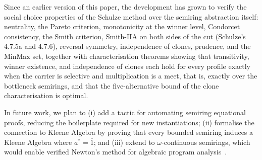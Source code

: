 \documentclass[a4paper,UKenglish,cleveref, autoref, thm-restate, anonymous]{lipics-v2021}
\begin{document}
Since an earlier version of this paper, the development has grown to
verify the social choice properties of the Schulze method over the
semiring abstraction itself: neutrality, the Pareto criterion,
monotonicity at the winner level, Condorcet consistency, the Smith
criterion, Smith-IIA on both sides of the cut (Schulze's 4.7.5a and
4.7.6), reversal symmetry, independence of clones, prudence, and the
MinMax set, together with characterisation theorems showing that
transitivity, winner existence, and independence of clones each hold for
every profile exactly when the carrier is selective and multiplication is
a meet, that is, exactly over the bottleneck semirings, and that the
five-alternative bound of the clone characterisation is optimal.

In future work, we plan to (i) add a tactic for automating semiring
equational proofs, reducing the boilerplate required for new
instantiations; (ii) formalise the connection to Kleene Algebra by
proving that every bounded semiring induces a Kleene Algebra where
$a^{*} = \overline{1}$; and (iii) extend to $\omega$-continuous
semirings, which would enable verified Newton's method for algebraic
program analysis~\cite{esparza2010newtonian}.



\appendix
\end{document}
